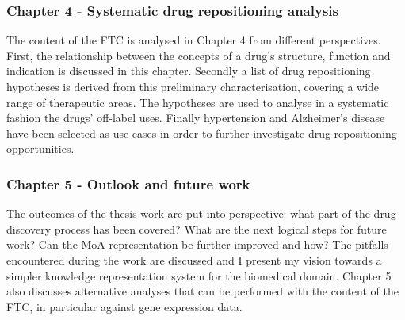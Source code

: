 \subsubsection{Chapter 4 - Systematic drug repositioning analysis}

The content of the FTC is analysed in Chapter 4 from different perspectives. First, the relationship between the concepts of a drug's structure, function and indication is discussed in this chapter. Secondly a list of drug repositioning hypotheses is derived from this preliminary characterisation, covering a wide range of therapeutic areas. The hypotheses are used to analyse in a systematic fashion the drugs' off-label uses. Finally hypertension and Alzheimer's disease have been selected as use-cases in order to further investigate drug repositioning opportunities.

\subsubsection{Chapter 5 - Outlook and future work}

The outcomes of the thesis work are put into perspective: what part of the drug discovery process has been covered? What are the next logical steps for future work? Can the MoA representation be further improved and how? The pitfalls encountered during the work are discussed and I present my vision towards a simpler knowledge representation system for the biomedical domain. Chapter 5 also discusses alternative analyses that can be performed with the content of the FTC, in particular against gene expression data.
